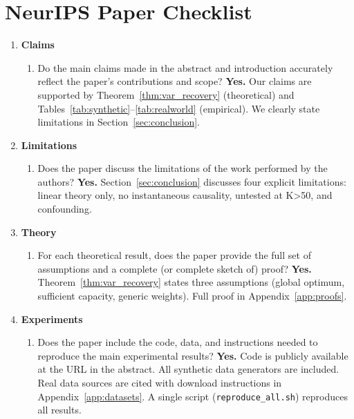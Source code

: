 
\newcommand{\answerYes}[1]{\textbf{Yes.} #1}
\newcommand{\answerNo}[1]{\textbf{No.} #1}
\newcommand{\answerNA}[1]{\textbf{N/A.} #1}

\section{NeurIPS Paper Checklist}

\begin{enumerate}

\item \textbf{Claims}
\begin{enumerate}
    \item Do the main claims made in the abstract and introduction accurately
    reflect the paper's contributions and scope?
    \answerYes{Our claims are supported by Theorem~\ref{thm:var_recovery}
    (theoretical) and Tables~\ref{tab:synthetic}--\ref{tab:realworld}
    (empirical). We clearly state limitations in Section~\ref{sec:conclusion}.}
\end{enumerate}

\item \textbf{Limitations}
\begin{enumerate}
    \item Does the paper discuss the limitations of the work performed by
    the authors?
    \answerYes{Section~\ref{sec:conclusion} discusses four explicit
    limitations: linear theory only, no instantaneous causality, untested
    at K>50, and confounding.}
\end{enumerate}

\item \textbf{Theory}
\begin{enumerate}
    \item For each theoretical result, does the paper provide the full set
    of assumptions and a complete (or complete sketch of) proof?
    \answerYes{Theorem~\ref{thm:var_recovery} states three assumptions
    (global optimum, sufficient capacity, generic weights). Full proof
    in Appendix~\ref{app:proofs}.}
\end{enumerate}

\item \textbf{Experiments}
\begin{enumerate}
    \item Does the paper include the code, data, and instructions needed to
    reproduce the main experimental results?
    \answerYes{Code is publicly available at the URL in the abstract.
    All synthetic data generators are included. Real data sources are
    cited with download instructions in Appendix~\ref{app:datasets}.
    A single script (\texttt{reproduce\_all.sh}) reproduces all results.}


\end{enumerate}
\end{enumerate}
